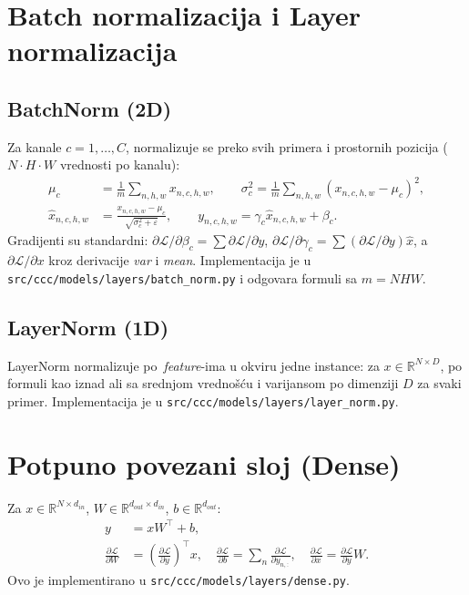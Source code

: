 \documentclass[11pt,a4paper]{article}
\begin{document}
\section{Batch normalizacija i Layer normalizacija}
\subsection{BatchNorm (2D)}
Za kanale $c=1,\dots,C$, normalizuje se preko svih primera i prostornih pozicija ($N\cdot H\cdot W$ vrednosti po kanalu):
\begin{align}
 \mu_c &= \frac{1}{m} \sum_{n,h,w} x_{n,c,h,w}, \qquad \sigma_c^2 = \frac{1}{m} \sum_{n,h,w} (x_{n,c,h,w}-\mu_c)^2, \\
 \hat{x}_{n,c,h,w} &= \frac{x_{n,c,h,w}-\mu_c}{\sqrt{\sigma_c^2+\varepsilon}}, \qquad y_{n,c,h,w} = \gamma_c \hat{x}_{n,c,h,w} + \beta_c.
\end{align}
Gradijenti su standardni: $\partial \mathcal{L}/\partial \beta_c = \sum \partial \mathcal{L}/\partial y$, $\partial \mathcal{L}/\partial \gamma_c = \sum (\partial \mathcal{L}/\partial y)\hat{x}$, a $\partial \mathcal{L}/\partial x$ kroz derivacije \emph{var} i \emph{mean}. Implementacija je u \texttt{src/ccc/models/layers/batch\_norm.py} i odgovara formuli sa $m=N H W$.

\subsection{LayerNorm (1D)}
LayerNorm normalizuje po \,\emph{feature}-ima u okviru jedne instance: za $x\in\mathbb{R}^{N\times D}$, po formuli kao iznad ali sa srednjom vrednošću i varijansom po dimenziji $D$ za svaki primer. Implementacija je u \texttt{src/ccc/models/layers/layer\_norm.py}.

\section{Potpuno povezani sloj (Dense)}
Za $x\in\mathbb{R}^{N\times d_{in}}$, $W\in\mathbb{R}^{d_{out}\times d_{in}}$, $b\in\mathbb{R}^{d_{out}}$:
\begin{align}
 y &= x W^\top + b, \\
 \frac{\partial \mathcal{L}}{\partial W} &= \left(\frac{\partial \mathcal{L}}{\partial y}\right)^\top x, \quad
 \frac{\partial \mathcal{L}}{\partial b} = \sum_{n} \frac{\partial \mathcal{L}}{\partial y_{n,:}}, \quad
 \frac{\partial \mathcal{L}}{\partial x} = \frac{\partial \mathcal{L}}{\partial y} W.
\end{align}
Ovo je implementirano u \texttt{src/ccc/models/layers/dense.py}.
\end{document}

